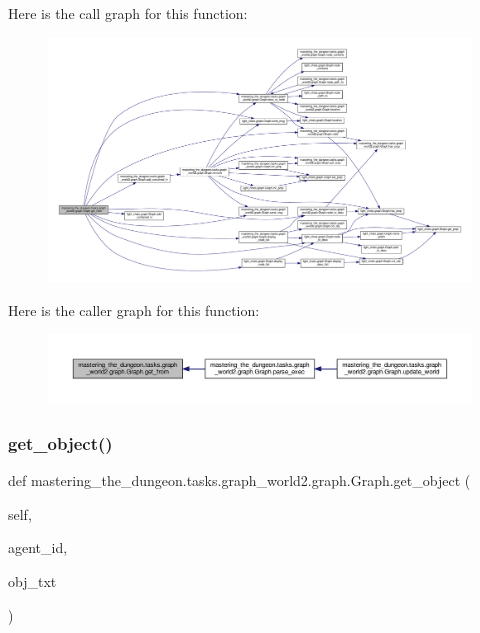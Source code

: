Here is the call graph for this function\+:
\nopagebreak
\begin{figure}[H]
\begin{center}
\leavevmode
\includegraphics[width=350pt]{classmastering__the__dungeon_1_1tasks_1_1graph__world2_1_1graph_1_1Graph_a3b953eab2aa57119b16c108db7ed0656_cgraph}
\end{center}
\end{figure}
Here is the caller graph for this function\+:
\nopagebreak
\begin{figure}[H]
\begin{center}
\leavevmode
\includegraphics[width=350pt]{classmastering__the__dungeon_1_1tasks_1_1graph__world2_1_1graph_1_1Graph_a3b953eab2aa57119b16c108db7ed0656_icgraph}
\end{center}
\end{figure}
\mbox{\label{classmastering__the__dungeon_1_1tasks_1_1graph__world2_1_1graph_1_1Graph_a8bd1d9fe1ede5105100e8f9fee16cf97}} 
\subsubsection{\texorpdfstring{get\+\_\+object()}{get\_object()}}
{\footnotesize\ttfamily def mastering\+\_\+the\+\_\+dungeon.\+tasks.\+graph\+\_\+world2.\+graph.\+Graph.\+get\+\_\+object (\begin{DoxyParamCaption}\item[{}]{self,  }\item[{}]{agent\+\_\+id,  }\item[{}]{obj\+\_\+txt }\end{DoxyParamCaption})}



